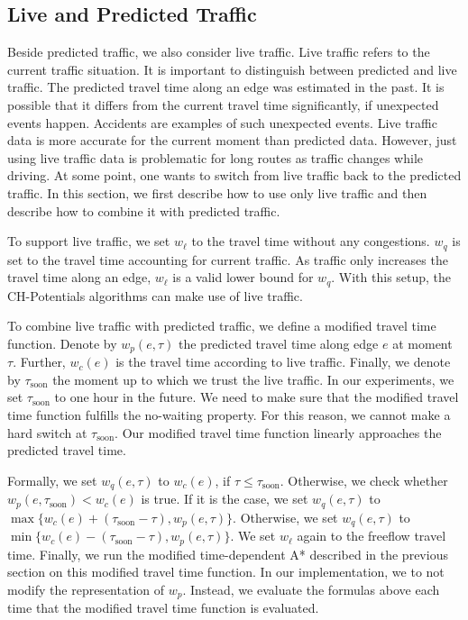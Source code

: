 \documentclass[letterpaper]{article} %
\begin{document}
\subsection{Live and Predicted Traffic}
\label{sec:live-predicted-traffic}

Beside predicted traffic, we also consider live traffic.
Live traffic refers to the current traffic situation.
It is important to distinguish between predicted and live traffic.
The predicted travel time along an edge was estimated in the past.
It is possible that it differs from the current travel time significantly, if unexpected events happen.
Accidents are examples of such unexpected events.
Live traffic data is more accurate for the current moment than predicted data.
However, just using live traffic data is problematic for long routes as traffic changes while driving.
At some point, one wants to switch from live traffic back to the predicted traffic.
In this section, we first describe how to use only live traffic and then describe how to combine it with predicted traffic.

To support live traffic, we set $w_\ell$ to the travel time without any congestions.
$w_q$ is set to the travel time accounting for current traffic.
As traffic only increases the travel time along an edge, $w_\ell$ is a valid lower bound for $w_q$.
With this setup, the CH-Potentials algorithms can make use of live traffic.

To combine live traffic with predicted traffic, we define a modified travel time function.
Denote by $w_p(e,\tau)$ the predicted travel time along edge $e$ at moment $\tau$.
Further, $w_c(e)$ is the travel time according to live traffic.
Finally, we denote by $\tau_{\mathrm{soon}}$ the moment up to which we trust the live traffic.
In our experiments, we set $\tau_{\mathrm{soon}}$ to one hour in the future.
We need to make sure that the modified travel time function fulfills the no-waiting property.
For this reason, we cannot make a hard switch at $\tau_{\mathrm{soon}}$.
Our modified travel time function linearly approaches the predicted travel time. %

Formally, we set $w_q(e,\tau)$ to $w_c(e)$, if $\tau \leq \tau_{\mathrm{soon}}$.
Otherwise, we check whether $w_p(e,\tau_{\mathrm{soon}}) < w_c(e)$ is true.
If it is the case, we set $w_q(e,\tau)$ to $\max\{w_c(e)+(\tau_{\mathrm{soon}}-\tau), w_p(e,\tau)\}$.
Otherwise, we set $w_q(e,\tau)$ to $\min\{w_c(e)-(\tau_{\mathrm{soon}}-\tau), w_p(e,\tau)\}$.
We set $w_\ell$ again to the freeflow travel time.
Finally, we run the modified time-dependent A* described in the previous section on this modified travel time function.
In our implementation, we to not modify the representation of $w_p$.
Instead, we evaluate the formulas above each time that the modified travel time function is evaluated.
\end{document}
